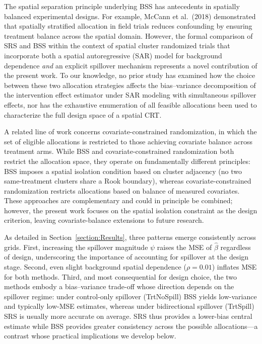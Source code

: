 \documentclass{article}[11pt]
\begin{document}
The spatial separation principle underlying BSS has antecedents in spatially balanced experimental designs. For example, McCann et al.~(2018) demonstrated that spatially stratified allocation in field trials reduces confounding by ensuring treatment balance across the spatial domain\cite{mccann_spatial_2018}. However, the formal comparison of SRS and BSS within the context of spatial cluster randomized trials that incorporate both a spatial autoregressive (SAR) model for background dependence \emph{and} an explicit spillover mechanism represents a novel contribution of the present work. To our knowledge, no prior study has examined how the choice between these two allocation strategies affects the bias--variance decomposition of the intervention effect estimator under SAR modeling with simultaneous spillover effects, nor has the exhaustive enumeration of all feasible allocations been used to characterize the full design space of a spatial CRT.

A related line of work concerns covariate-constrained randomization, in which the set of eligible allocations is restricted to those achieving covariate balance across treatment arms\cite{crisp_covariate-constrained_2023}. While BSS and covariate-constrained randomization both restrict the allocation space, they operate on fundamentally different principles: BSS imposes a spatial isolation condition based on cluster adjacency (no two same-treatment clusters share a Rook boundary), whereas covariate-constrained randomization restricts allocations based on balance of measured covariates. These approaches are complementary and could in principle be combined; however, the present work focuses on the spatial isolation constraint as the design criterion, leaving covariate-balance extensions to future research.

As detailed in Section~\ref{section:Results}, three patterns emerge consistently across grids. First, increasing the spillover magnitude $\psi$ raises the MSE of $\hat{\beta}$ regardless of design, underscoring the importance of accounting for spillover at the design stage. Second, even slight background spatial dependence ($\rho = 0.01$) inflates MSE for both methods. Third, and most consequential for design choice, the two methods embody a bias--variance trade-off whose direction depends on the spillover regime: under control-only spillover (TrtNoSpill) BSS yields low-variance and typically low-MSE estimates, whereas under bidirectional spillover (TrtSpill) SRS is usually more accurate on average. SRS thus provides a lower-bias central estimate while BSS provides greater consistency across the possible allocations---a contrast whose practical implications we develop below.
\end{document}
